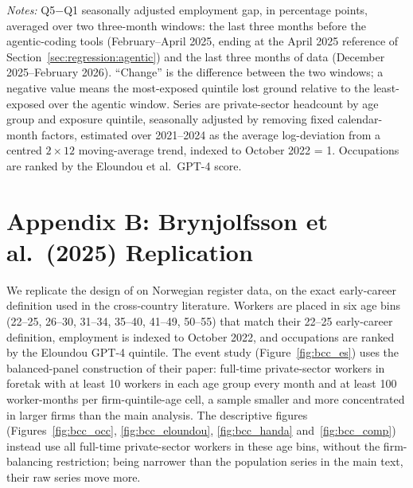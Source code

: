 \documentclass[12pt]{article}
\begin{document}
\begin{table}[htbp]
  \centering
  \caption{Most-exposed-minus-least-exposed employment gap before and after the agentic transition, private sector.}
  \label{tab:agentic_window}
  
  \begin{minipage}{\textwidth}\footnotesize\textit{Notes:} Q5$-$Q1 seasonally adjusted employment gap, in percentage points, averaged over two three-month windows: the last three months before the agentic-coding tools (February--April 2025, ending at the April 2025 reference of Section~\ref{sec:regression:agentic}) and the last three months of data (December 2025--February 2026). ``Change'' is the difference between the two windows; a negative value means the most-exposed quintile lost ground relative to the least-exposed over the agentic window. Series are private-sector headcount by age group and exposure quintile, seasonally adjusted by removing fixed calendar-month factors, estimated over 2021--2024 as the average log-deviation from a centred $2\times12$ moving-average trend, indexed to October 2022 = 1. Occupations are ranked by the Eloundou et al.\ GPT-4 score.\end{minipage}
\end{table}


\clearpage
{}
{}
\section*{Appendix B: Brynjolfsson et al.\ (2025) Replication}\label{app:bcc}
\setcounter{figure}{0}
\renewcommand{\thefigure}{B\arabic{figure}}
\setcounter{table}{0}
\renewcommand{\thetable}{B\arabic{table}}

We replicate the design of \citet{brynjolfsson2025} on Norwegian register data, on the exact early-career definition used in the cross-country literature. Workers are placed in six age bins (22--25, 26--30, 31--34, 35--40, 41--49, 50--55) that match their 22--25 early-career definition, employment is indexed to October 2022, and occupations are ranked by the Eloundou GPT-4 quintile. The event study (Figure~\ref{fig:bcc_es}) uses the balanced-panel construction of their paper: full-time private-sector workers in foretak with at least 10 workers in each age group every month and at least 100 worker-months per firm-quintile-age cell, a sample smaller and more concentrated in larger firms than the main analysis. The descriptive figures (Figures~\ref{fig:bcc_occ}, \ref{fig:bcc_eloundou}, \ref{fig:bcc_handa} and~\ref{fig:bcc_comp}) instead use all full-time private-sector workers in these age bins, without the firm-balancing restriction; being narrower than the population series in the main text, their raw series move more.
\end{document}
